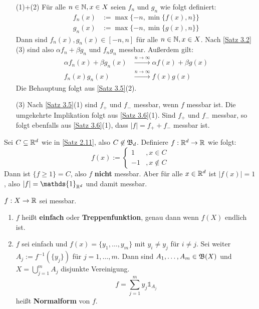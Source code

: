 \documentclass[a4paper,twoside,DIV15,BCOR12mm,chapterprefix=true,headings=onelinechapter]{scrbook}
\begin{document}
\begin{beweis}
\begin{enumerate}
\item[(1)+(2)] Für alle $n\in\mathbb{N}, x\in X$ seien $f_n$ und $g_n$ wie folgt definiert:
\begin{align*}
f_n(x)&:=\max\{-n,\min\{f(x),n\}\}\\
g_n(x)&:=\max\{-n,\min\{g(x),n\}\}
\end{align*}
Dann sind $f_n(x),g_n(x)\in[-n,n]$ für alle $n\in\mathbb{N},x\in X$. Nach \ref{Satz 3.2}(3) sind also $\alpha f_n+\beta g_n$ und $f_ng_n$ messbar. Außerdem gilt:
\begin{align*}
\alpha f_n(x)+\beta g_n(x)&\stackrel{n\to\infty}\to \alpha f(x)+\beta g(x)\\
f_n(x)g_n(x)&\stackrel{n\to\infty}\to f(x)g(x)
\end{align*}
Die Behauptung folgt aus \ref{Satz 3.5}(2).
\item[(3)] Nach \ref{Satz 3.5}(1) sind $f_+$ und $f_-$ messbar, wenn $f$ messbar ist. Die umgekehrte Implikation folgt aus \ref{Satz 3.6}(1). Sind $f_+$ und $f_-$ messbar, so folgt ebenfalls aus \ref{Satz 3.6}(1), dass $|f|=f_++f_-$ messbar ist.
\end{enumerate}
\end{beweis}

\begin{beispiel}
Sei $C\subseteq\mathbb{R}^d$ wie in \ref{Satz 2.11}, also $C\not\in\mathfrak{B}_d$. Definiere $f:\mathbb{R}^d\to\mathbb{R}$ wie folgt:
\[f(x):=\begin{cases} 1&,x\in C\\ -1&,x\not\in C\end{cases}\]
Dann ist $\{f\ge 1\}=C$, also $f$ \textbf{nicht} messbar. Aber für alle $x\in\mathbb{R}^d$ ist $|f(x)|=1$, also $|f|=\mathds{1}_{\mdr^d}$ und damit messbar.
\end{beispiel}

\begin{definition}
$f:X\to\mathbb{R}$ sei messbar.
\begin{enumerate}
\item $f$ heißt \textbf{einfach} oder \textbf{Treppenfunktion}, genau dann wenn $f(X)$ endlich ist.
\item $f$ sei einfach und $f(x)=\{y_1,\ldots,y_m\}$ mit $y_i\ne y_j$ für $i\ne j$. Sei weiter $A_j:=f^{-1}(\{y_j\})$ für $j=1,\ldots,m$. Dann sind $A_1,\ldots,A_m\in\mathfrak{B}(X)$ und $X=\bigcup_{j=1}^m A_j$ disjunkte Vereinigung.
\[f=\sum_{j=1}^m y_j \mathds{1}_{A_j}\]
heißt \textbf{Normalform} von $f$.
\end{enumerate}
\end{definition}
\end{document}
